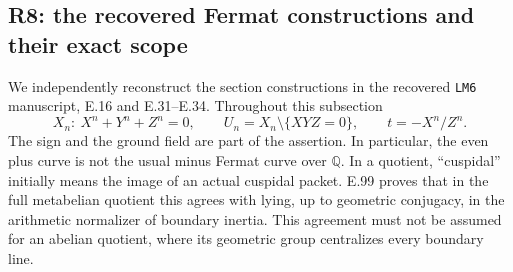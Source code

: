 \subsection{R8: the recovered Fermat constructions and their exact scope}

We independently reconstruct the section constructions in the recovered
\texttt{LM6} manuscript, E.16 and E.31--E.34.  Throughout this subsection
\[
 X_n:\ X^n+Y^n+Z^n=0,\qquad
 U_n=X_n\setminus\{XYZ=0\},\qquad
 t=-X^n/Z^n.
\]
The sign and the ground field are part of the assertion.  In particular,
the even plus curve is not the usual minus Fermat curve over
\(\mathbb Q\).  In a quotient, ``cuspidal'' initially means the image
of an actual cuspidal packet.  E.99 proves that in the full metabelian
quotient this agrees with lying, up to geometric conjugacy, in the
arithmetic normalizer of boundary inertia.  This agreement must not be
assumed for an abelian quotient, where its geometric group centralizes
every boundary line.

